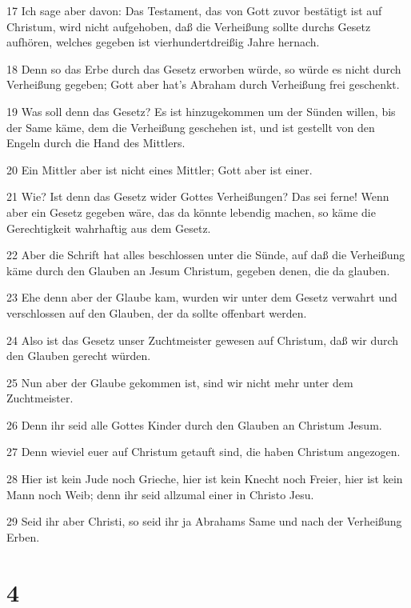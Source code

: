 \par 17 Ich sage aber davon: Das Testament, das von Gott zuvor bestätigt ist auf Christum, wird nicht aufgehoben, daß die Verheißung sollte durchs Gesetz aufhören, welches gegeben ist vierhundertdreißig Jahre hernach.
\par 18 Denn so das Erbe durch das Gesetz erworben würde, so würde es nicht durch Verheißung gegeben; Gott aber hat's Abraham durch Verheißung frei geschenkt.
\par 19 Was soll denn das Gesetz? Es ist hinzugekommen um der Sünden willen, bis der Same käme, dem die Verheißung geschehen ist, und ist gestellt von den Engeln durch die Hand des Mittlers.
\par 20 Ein Mittler aber ist nicht eines Mittler; Gott aber ist einer.
\par 21 Wie? Ist denn das Gesetz wider Gottes Verheißungen? Das sei ferne! Wenn aber ein Gesetz gegeben wäre, das da könnte lebendig machen, so käme die Gerechtigkeit wahrhaftig aus dem Gesetz.
\par 22 Aber die Schrift hat alles beschlossen unter die Sünde, auf daß die Verheißung käme durch den Glauben an Jesum Christum, gegeben denen, die da glauben.
\par 23 Ehe denn aber der Glaube kam, wurden wir unter dem Gesetz verwahrt und verschlossen auf den Glauben, der da sollte offenbart werden.
\par 24 Also ist das Gesetz unser Zuchtmeister gewesen auf Christum, daß wir durch den Glauben gerecht würden.
\par 25 Nun aber der Glaube gekommen ist, sind wir nicht mehr unter dem Zuchtmeister.
\par 26 Denn ihr seid alle Gottes Kinder durch den Glauben an Christum Jesum.
\par 27 Denn wieviel euer auf Christum getauft sind, die haben Christum angezogen.
\par 28 Hier ist kein Jude noch Grieche, hier ist kein Knecht noch Freier, hier ist kein Mann noch Weib; denn ihr seid allzumal einer in Christo Jesu.
\par 29 Seid ihr aber Christi, so seid ihr ja Abrahams Same und nach der Verheißung Erben.

\chapter{4}

